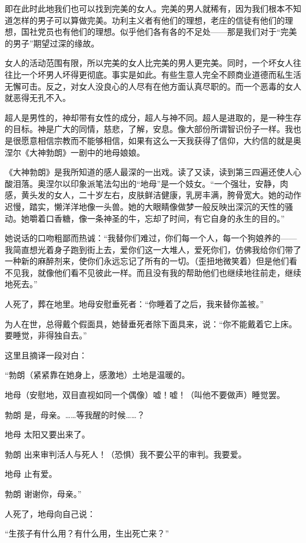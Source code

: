 \par 即在此时此地我们也可以找到完美的女人。完美的男人就稀有，因为我们根本不知道怎样的男子可以算做完美。功利主义者有他们的理想，老庄的信徒有他们的理想，国社党员也有他们的理想。似乎他们各有各的不足处——那是我们对于“完美的男子”期望过深的缘故。
\par 女人的活动范围有限，所以完美的女人比完美的男人更完美。同时，一个坏女人往往比一个坏男人坏得更彻底。事实是如此。有些生意人完全不顾商业道德而私生活无懈可击。反之，对女人没良心的人尽有在他方面认真尽职的。而一个恶毒的女人就恶得无孔不入。
\par 超人是男性的，神却带有女性的成分，超人与神不同。超人是进取的，是一种生存的目标。神是广大的同情，慈悲，了解，安息。像大部份所谓智识份子一样。我也是很愿意相信宗教而不能够相信，如果有这么一天我获得了信仰，大约信的就是奥涅尔《大神勃朗》一剧中的地母娘娘。
\par 《大神勃朗》是我所知道的感人最深的一出戏。读了又读，读到第三四遍还使人心酸泪落。奥涅尔以印象派笔法勾出的“地母”是一个妓女。“一个强壮，安静，肉感，黄头发的女人，二十岁左右，皮肤鲜洁健康，乳房丰满，胯骨宽大。她的动作迟慢，踏实，懒洋洋地像一头兽。她的大眼睛像做梦一般反映出深沉的天性的骚动。她嚼着口香糖，像一条神圣的牛，忘却了时间，有它自身的永生的目的。”
\par 她说话的口吻粗鄙而热诚：“我替你们难过，你们每一个人，每一个狗娘养的——我简直想光着身子跑到街上去，爱你们这一大堆人，爱死你们，仿佛我给你们带了一种新的麻醉剂来，使你们永远忘记了所有的一切。（歪扭地微笑着）但是他们看不见我，就像他们看不见彼此一样。而且没有我的帮助他们也继续地往前走，继续地死去。”
\par 人死了，葬在地里。地母安慰垂死者：“你睡着了之后，我来替你盖被。”
\par 为人在世，总得戴个假面具，她替垂死者除下面具来，说：“你不能戴着它上床。要睡觉，非得独自去。”
\par 这里且摘译一段对白：
\par “勃朗（紧紧靠在她身上，感激地）土地是温暖的。
\par 地母（安慰地，双目直视如同一个偶像）嘘！嘘！（叫他不要做声）睡觉罢。
\par 勃朗 是，母亲。……等我醒的时候……？
\par 地母 太阳又要出来了。
\par 勃朗 出来审判活人与死人！（恐惧）我不要公平的审判。我要爱。
\par 地母 止有爱。
\par 勃朗 谢谢你，母亲。”
\par 人死了，地母向自己说：
\par “生孩子有什么用？有什么用，生出死亡来？”
